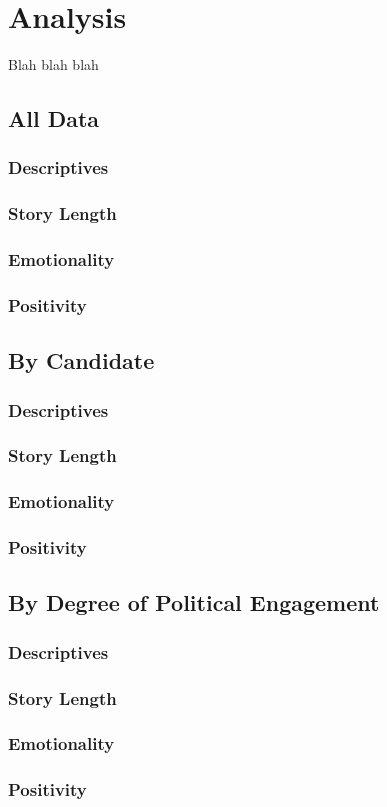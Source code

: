  \chapter{Analysis}
 Blah blah blah

 \section{All Data}
 \subsection{Descriptives}
 \subsection{Story Length}
 \subsection{Emotionality}
 \subsection{Positivity}

  \section{By Candidate}
 \subsection{Descriptives}
 \subsection{Story Length}
 \subsection{Emotionality}
 \subsection{Positivity}


  \section{By Degree of Political Engagement}
 \subsection{Descriptives}
 \subsection{Story Length}
 \subsection{Emotionality}
 \subsection{Positivity}